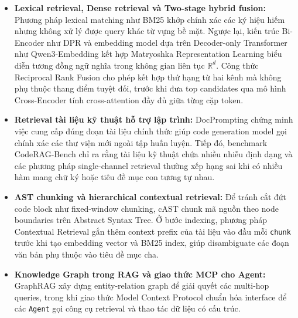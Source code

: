 \begin{itemize}
    \item \textbf{Lexical retrieval, Dense retrieval và Two-stage hybrid fusion:} Phương pháp lexical matching như BM25 \cite{robertson2009bm25} khớp chính xác các ký hiệu hiếm nhưng không xử lý được query khác từ vựng bề mặt. Ngược lại, kiến trúc Bi-Encoder như DPR \cite{karpukhin2020dpr} và embedding model dựa trên Decoder-only Transformer như Qwen3-Embedding \cite{zhang2025qwen3} kết hợp Matryoshka Representation Learning \cite{kusupati2022mrl} biểu diễn tương đồng ngữ nghĩa trong không gian liên tục $\mathbb{R}^d$. Công thức Reciprocal Rank Fusion \cite{cormack2009rrf} cho phép kết hợp thứ hạng từ hai kênh mà không phụ thuộc thang điểm tuyệt đối, trước khi đưa top candidates qua mô hình Cross-Encoder \cite{nogueira2019bert, wang2021minilm} tính cross-attention đầy đủ giữa từng cặp token.
    \item \textbf{Retrieval tài liệu kỹ thuật hỗ trợ lập trình:} DocPrompting \cite{zhou2023docprompting} chứng minh việc cung cấp đúng đoạn tài liệu chính thức giúp code generation model gọi chính xác các thư viện mới ngoài tập huấn luyện. Tiếp đó, benchmark CodeRAG-Bench \cite{wang2025coderag} chỉ ra rằng tài liệu kỹ thuật chứa nhiều nhiễu định dạng và các phương pháp single-channel retrieval thường xếp hạng sai khi có nhiều hàm mang chữ ký hoặc tiêu đề mục con tương tự nhau.
    \item \textbf{AST chunking và hierarchical contextual retrieval:} Để tránh cắt đứt code block như fixed-window chunking, cAST \cite{zhang2025cast} chunk mã nguồn theo node boundaries trên Abstract Syntax Tree. Ở bước indexing, phương pháp Contextual Retrieval \cite{anthropic2024contextual} gắn thêm context prefix của tài liệu vào đầu mỗi \texttt{chunk} trước khi tạo embedding vector và BM25 index, giúp disambiguate các đoạn văn bản phụ thuộc vào tiêu đề mục cha.
    \item \textbf{Knowledge Graph trong RAG và giao thức MCP cho Agent:} GraphRAG \cite{edge2024graphrag} xây dựng entity-relation graph để giải quyết các multi-hop queries, trong khi giao thức Model Context Protocol \cite{anthropic2024mcp} chuẩn hóa interface để các \texttt{Agent} gọi công cụ retrieval và thao tác dữ liệu có cấu trúc.
\end{itemize}

